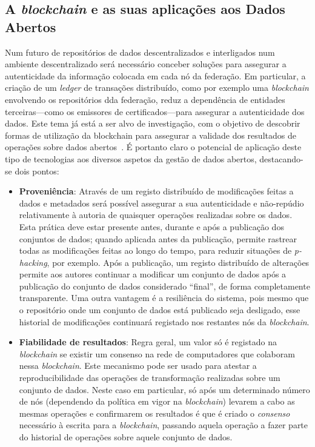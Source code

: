 \documentclass[sigconf,nonacm]{acmart}
\begin{document}
\subsection{A \emph{blockchain} e as suas aplicações aos Dados Abertos}

Num futuro de repositórios de dados descentralizados e interligados num ambiente descentralizado será necessário conceber soluções para assegurar a autenticidade da informação colocada em cada nó da federação. Em particular, a criação de um \emph{ledger} de transações distribuído, como por exemplo uma \emph{blockchain} envolvendo os repositórios dda federação, reduz a dependência de entidades terceiras---como os emissores de certificados---para assegurar a autenticidade dos dados. Este tema já está a ser alvo de investigação, com o objetivo de descobrir formas de utilização da blockchain para assegurar a validade dos resultados de operações sobre dados abertos~\cite{10.1007/978-3-030-23946-6_28}. É portanto claro o potencial de aplicação deste tipo de tecnologias aos diversos aspetos da gestão de dados abertos, destacando-se dois pontos:

\begin{itemize}
	\item \textbf{Proveniência}: Através de um registo distribuído de modificações feitas a dados e metadados será possível assegurar a sua autenticidade e não-repúdio relativamente à autoria de quaisquer operações realizadas sobre os dados. Esta prática deve estar presente antes, durante e após a publicação dos conjuntos de dados; quando aplicada antes da publicação, permite rastrear todas as modificações feitas ao longo do tempo, para reduzir situações de \emph{p-hacking}\cite{10.1371/journal.pbio.1002106}, por exemplo. Após a publicação, um registo distribuído de alterações permite aos autores continuar a modificar um conjunto de dados após a publicação do conjunto de dados considerado ``final'', de forma completamente transparente. Uma outra vantagem é a resiliência do sistema, pois mesmo que o repositório onde um conjunto de dados está publicado seja desligado, esse historial de modificações continuará registado nos restantes nós da \emph{blockchain}.
	\item \textbf{Fiabilidade de resultados}: Regra geral, um valor só é registado na \emph{blockchain} se existir um consenso na rede de computadores que colaboram nessa \emph{blockchain}. Este mecanismo pode ser usado para atestar a reproducibilidade das operações de transformação realizadas sobre um conjunto de dados. Neste caso em particular, só após um determinado número de nós (dependendo da política em vigor na \emph{blockchain}) levarem a cabo as mesmas operações e confirmarem os resultados é que é criado o \emph{consenso} necessário à escrita para a \emph{blockchain}, passando aquela operação a fazer parte do historial de operações sobre aquele conjunto de dados. 
\end{itemize}
\end{document}
